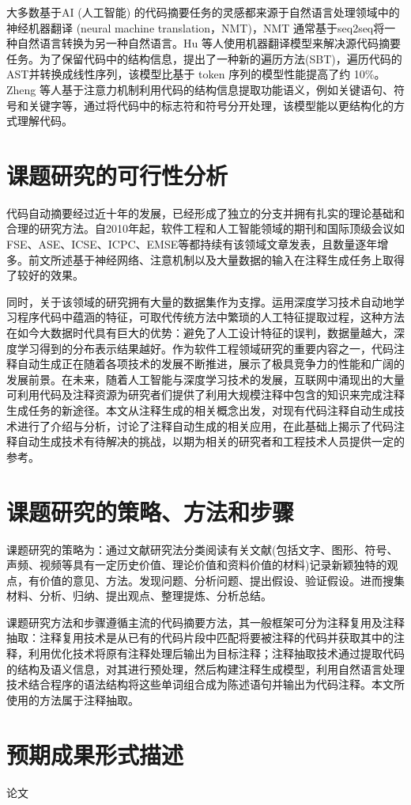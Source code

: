 大多数基于AI (人工智能) 的代码摘要任务的灵感都来源于自然语言处理领域中的神经机器翻译 (neural machine translation，NMT)，NMT 通常基于seq2seq将一种自然语言转换为另一种自然语言\cite{leclair2019neural}。Hu 等人使用机器翻译模型来解决源代码摘要任务\cite{hu2018deep}。为了保留代码中的结构信息，提出了一种新的遍历方法(SBT)，遍历代码的 AST并转换成线性序列，该模型比基于 token 序列的模型性能提高了约 10\%。Zheng 等人基于注意力机制利用代码的结构信息提取功能语义，例如关键语句、符号和关键字等，通过将代码中的标志符和符号分开处理，该模型能以更结构化的方式理解代码\cite{zheng2019codeattention}。


\section{课题研究的可行性分析}
代码自动摘要经过近十年的发展，已经形成了独立的分支并拥有扎实的理论基础和合理的研究方法。自2010年起，软件工程和人工智能领域的期刊和国际顶级会议如 FSE、ASE、ICSE、ICPC、EMSE等都持续有该领域文章发表，且数量逐年增多。前文所述基于神经网络、注意机制以及大量数据的输入在注释生成任务上取得了较好的效果。

同时，关于该领域的研究拥有大量的数据集作为支撑。运用深度学习技术自动地学习程序代码中蕴涵的特征，可取代传统方法中繁琐的人工特征提取过程，这种方法在如今大数据时代具有巨大的优势：避免了人工设计特征的误判，数据量越大，深度学习得到的分布表示结果越好。作为软件工程领域研究的重要内容之一，代码注释自动生成正在随着各项技术的发展不断推进，展示了极具竞争力的性能和广阔的发展前景。在未来，随着人工智能与深度学习技术的发展，互联网中涌现出的大量可利用代码及注释资源为研究者们提供了利用大规模注释中包含的知识来完成注释生成任务的新途径。本文从注释生成的相关概念出发，对现有代码注释自动生成技术进行了介绍与分析，讨论了注释自动生成的相关应用，在此基础上揭示了代码注释自动生成技术有待解决的挑战，以期为相关的研究者和工程技术人员提供一定的参考。


\section{课题研究的策略、方法和步骤}
课题研究的策略为：通过文献研究法分类阅读有关文献(包括文字、图形、符号、声频、视频等具有一定历史价值、理论价值和资料价值的材料)记录新颖独特的观点，有价值的意见、方法。发现问题、分析问题、提出假设、验证假设。进而搜集材料、分析、归纳、提出观点、整理提炼、分析总结。

课题研究方法和步骤遵循主流的代码摘要方法，其一般框架可分为注释复用及注释抽取：注释复用技术是从已有的代码片段中匹配将要被注释的代码并获取其中的注释，利用优化技术将原有注释处理后输出为目标注释；注释抽取技术通过提取代码的结构及语义信息，对其进行预处理，然后构建注释生成模型，利用自然语言处理技术结合程序的语法结构将这些单词组合成为陈述语句并输出为代码注释。本文所使用的方法属于注释抽取。



\section{预期成果形式描述}
论文


